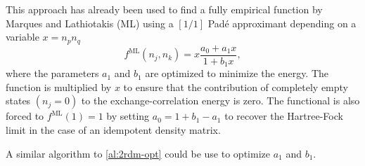 This approach has already been used to find a fully empirical function by Marques
and Lathiotakis (ML) using a $[1/ 1]$ Padé approximant
depending on a variable $x = n_p n_q$
\begin{equation}
    f^{\text{ML}}\left( n_j, n_k \right) =
    x
    \frac{
        a_0 + a_1 x
    }{
        1 + b_1 x
    }
    ,
\end{equation}
where the parameters $a_1$ and $b_1$ are optimized to minimize the energy.
The function is multiplied by $x$ to ensure that the
contribution of completely empty states $\left( n_j = 0 \right)$ to the
exchange-correlation energy is zero.
The functional is also forced to $f^{\text{ML}}\left( 1 \right) = 1$ by
setting $a_0 = 1 + b_1 - a_1$ to recover the Hartree-Fock limit in the
case of an idempotent density matrix.

A similar algorithm to \cref{al:2rdm-opt} could be use to optimize
$a_1$ and $b_1$.
